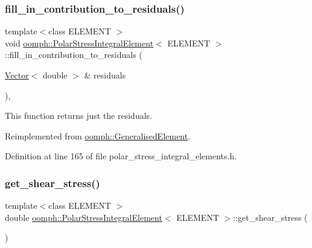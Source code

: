 \subsubsection{\texorpdfstring{fill\+\_\+in\+\_\+contribution\+\_\+to\+\_\+residuals()}{fill\_in\_contribution\_to\_residuals()}}
{\footnotesize\ttfamily template$<$class E\+L\+E\+M\+E\+NT $>$ \\
void \hyperlink{classoomph_1_1PolarStressIntegralElement}{oomph\+::\+Polar\+Stress\+Integral\+Element}$<$ E\+L\+E\+M\+E\+NT $>$\+::fill\+\_\+in\+\_\+contribution\+\_\+to\+\_\+residuals (\begin{DoxyParamCaption}\item[{\hyperlink{classoomph_1_1Vector}{Vector}$<$ double $>$ \&}]{residuals }\end{DoxyParamCaption})\hspace{0.3cm}{\ttfamily [inline]}, {\ttfamily [virtual]}}



This function returns just the residuals. 



Reimplemented from \hyperlink{classoomph_1_1GeneralisedElement_a310c97f515e8504a48179c0e72c550d7}{oomph\+::\+Generalised\+Element}.



Definition at line 165 of file polar\+\_\+stress\+\_\+integral\+\_\+elements.\+h.

\mbox{\label{classoomph_1_1PolarStressIntegralElement_ae52aa0de04a32c399c59d66154739e3f}} 
\subsubsection{\texorpdfstring{get\+\_\+shear\+\_\+stress()}{get\_shear\_stress()}}
{\footnotesize\ttfamily template$<$class E\+L\+E\+M\+E\+NT $>$ \\
double \hyperlink{classoomph_1_1PolarStressIntegralElement}{oomph\+::\+Polar\+Stress\+Integral\+Element}$<$ E\+L\+E\+M\+E\+NT $>$\+::get\+\_\+shear\+\_\+stress (\begin{DoxyParamCaption}{ }\end{DoxyParamCaption})}



